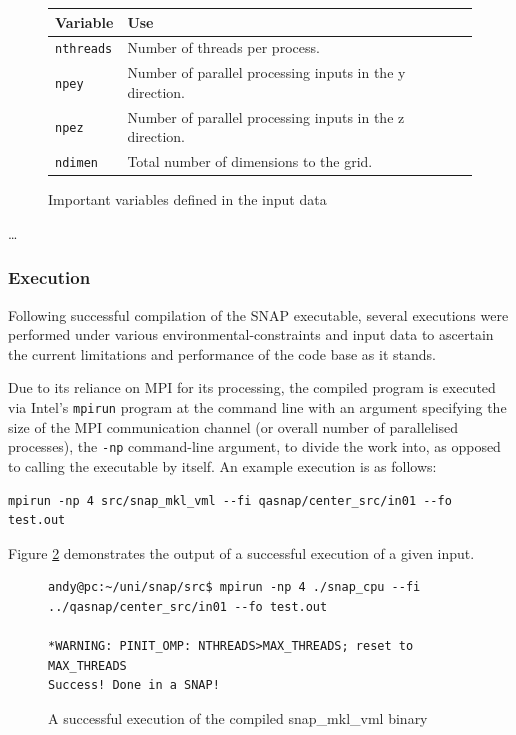 \documentclass[conference]{IEEEtran}
\begin{document}
\begin{figure}[h]
    \centering
    \begin{tabular}{| p{1.7cm} | p{5.7cm} |}
        \hline
        Variable & Use \\
        \hline
        \texttt{nthreads} & Number of threads per process. \\
        \texttt{npey} & Number of parallel processing inputs in the y direction. \\
        \texttt{npez} & Number of parallel processing inputs in the z direction. \\
        \texttt{ndimen} & Total number of dimensions to the grid. \\
        \hline
    \end{tabular}
    \caption{Important variables defined in the input data}
    \label{table:input-data}
\end{figure}

\dots

\subsubsection{Execution}

Following successful compilation of the SNAP executable, several executions were performed under various environmental-constraints and input data to ascertain the current limitations and performance of the code base as it stands.

Due to its reliance on MPI for its processing, the compiled program is executed via Intel's \texttt{mpirun} program at the command line with an argument specifying the size of the MPI communication channel (or overall number of parallelised processes), the \texttt{-np} command-line argument, to divide the work into, as opposed to calling the executable by itself. An example execution is as follows:

\begin{lstlisting}[breaklines]
mpirun -np 4 src/snap_mkl_vml --fi qasnap/center_src/in01 --fo test.out
\end{lstlisting}

Figure \ref{fig:snap-successful-run} demonstrates the output of a successful execution of a given input.

\begin{figure}[!h]
    \centering
    \begin{lstlisting}[breaklines]
andy@pc:~/uni/snap/src$ mpirun -np 4 ./snap_cpu --fi ../qasnap/center_src/in01 --fo test.out

*WARNING: PINIT_OMP: NTHREADS>MAX_THREADS; reset to MAX_THREADS
Success! Done in a SNAP!
    \end{lstlisting}
    \caption{A successful execution of the compiled snap\_mkl\_vml binary}
    \label{fig:snap-successful-run}
\end{figure}
\end{document}
